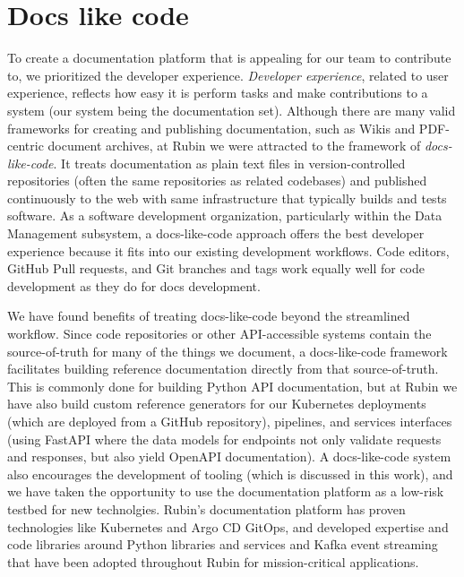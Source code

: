 \documentclass[11pt,twoside]{article}
\begin{document}

\section{Docs like code}


To create a documentation platform that is appealing for our team to contribute to, we prioritized the developer experience.
\emph{Developer experience}, related to user experience, reflects how easy it is perform tasks and make contributions to a system (our system being the documentation set).
Although there are many valid frameworks for creating and publishing documentation, such as Wikis and PDF-centric document archives, at Rubin we were attracted to the framework of \emph{docs-like-code}.
It treats documentation as plain text files in version-controlled repositories (often the same repositories as related codebases) and published continuously to the web with same infrastructure that typically builds and tests software.
As a software development organization, particularly within the Data Management subsystem, a docs-like-code approach offers the best developer experience because it fits into our existing development workflows.
Code editors, GitHub Pull requests, and Git branches and tags work equally well for code development as they do for docs development.

We have found benefits of treating docs-like-code beyond the streamlined workflow.
Since code repositories or other API-accessible systems contain the source-of-truth for many of the things we document, a docs-like-code framework facilitates building reference documentation directly from that source-of-truth.
This is commonly done for building Python API documentation, but at Rubin we have also build custom reference generators for our Kubernetes deployments (which are deployed from a GitHub repository), pipelines, and services interfaces (using FastAPI where the data models for endpoints not only validate requests and responses, but also yield OpenAPI documentation).
A docs-like-code system also encourages the development of tooling (which is discussed in this work), and we have taken the opportunity to use the documentation platform as a low-risk testbed for new technolgies.
Rubin's documentation platform has proven technologies like Kubernetes and Argo CD GitOps, and developed expertise and code libraries around Python libraries and services and Kafka event streaming that have been adopted throughout Rubin for mission-critical applications.
\end{document}
